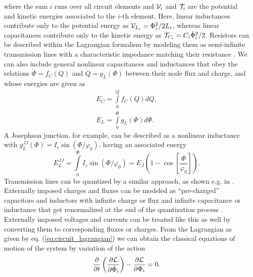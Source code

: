 %
where the sum $i$ runs over all circuit elements and $\begin{mathcal}V\end{mathcal}_i$ and $\begin{mathcal}T\end{mathcal}_i$ are the potential and kinetic energies associated to the $i$-th element. Here, linear inductances contribute only to the potential energy as $\begin{mathcal}V\end{mathcal}_{L_i} = \Phi_i^2/2L_i$, whereas linear capacitances contribute only to the kinetic energy as $\begin{mathcal}T\end{mathcal}_{C_i}=C_i\dot{\Phi}_i^2/2$. Resistors can be described within the Lagrangian formalism by modeling them as semi-infinite transmission lines with a characteristic impedance matching their resistance \citep{yurke_quantum_1984}. We can also include general nonlinear capacitances and inductances that obey the relations $\dot{\Phi}=f_C(Q)$ and $\dot{Q}=g_L(\Phi)$ between their node flux and charge, and whose energies are given as
%
\begin{eqnarray}
E_C = \int\limits_0^Q f_C(Q)dQ, \\
E_L = \int\limits_0^\Phi g_L(\Phi)d\Phi.
\end{eqnarray}
%
A Josephson junction, for example, can be described as a nonlinear inductance with $g_L^{JJ}(\Phi)=I_c\sin{(\Phi/\varphi_0)}$, having an associated energy
%
\begin{equation}
E_L^{JJ} = \int\limits_0^\Phi I_c\sin{\left(\Phi/\varphi_0\right)}=E_J(1-\cos{\left[\frac{\Phi}{\varphi_0}\right]}).
\end{equation}
%
Transmission lines can be quantized by a similar approach, as shown e.g. in \citep{yurke_quantum_1984}. Externally imposed charges and fluxes can be modeled as ``pre-charged'' capacitors and inductors with infinite charge or flux and infinite capacitance or inductance that get renormalized at the end of the quantization process \citep{devoret_quantum_1995}. Externally imposed voltages and currents can be treated like this as well by converting them to corresponding fluxes or charges. From the Lagrangian as given by eq. (\ref{eq:circuit_lagrangian}) we can obtain the classical equations of motion of the system by variation of the action
%
\begin{equation}
\frac{\partial}{\partial t}\left( \frac{\partial \begin{mathcal}L\end{mathcal}}{\partial\dot{\Phi}_i}\right)-\frac{\partial \begin{mathcal}L\end{mathcal}}{\partial \Phi_i} = 0.
\end{equation}
